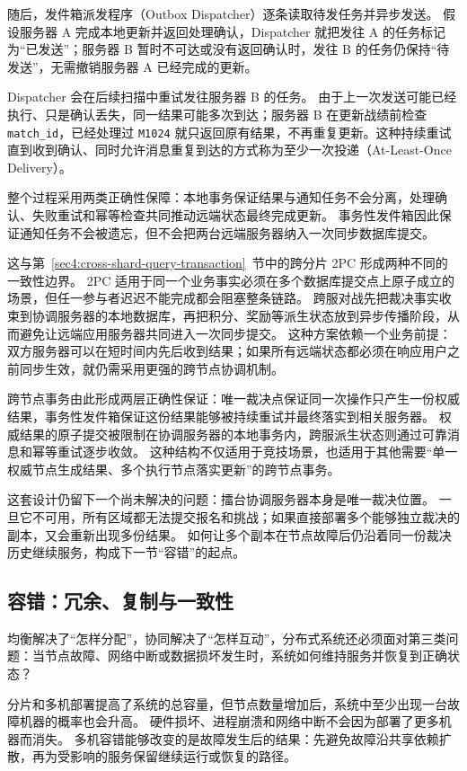 随后，发件箱派发程序（Outbox Dispatcher）逐条读取待发任务并异步发送。
假设服务器 A 完成本地更新并返回处理确认，Dispatcher 就把发往 A 的任务标记为“已发送”；服务器 B 暂时不可达或没有返回确认时，发往 B 的任务仍保持“待发送”，无需撤销服务器 A 已经完成的更新。

Dispatcher 会在后续扫描中重试发往服务器 B 的任务。
由于上一次发送可能已经执行、只是确认丢失，同一结果可能多次到达；服务器 B 在更新战绩前检查 \texttt{match\_id}，已经处理过 \texttt{M1024} 就只返回原有结果，不再重复更新。这种持续重试直到收到确认、同时允许消息重复到达的方式称为至少一次投递（At-Least-Once Delivery）。

整个过程采用两类正确性保障：本地事务保证结果与通知任务不会分离，处理确认、失败重试和幂等检查共同推动远端状态最终完成更新。
事务性发件箱因此保证通知任务不会被遗忘，但不会把两台远端服务器纳入一次同步数据库提交。

这与第~\ref{sec4:cross-shard-query-transaction}~节中的跨分片 2PC 形成两种不同的一致性边界。
2PC 适用于同一个业务事实必须在多个数据库提交点上原子成立的场景，但任一参与者迟迟不能完成都会阻塞整条链路。
跨服对战先把裁决事实收束到协调服务器的本地数据库，再把积分、奖励等派生状态放到异步传播阶段，从而避免让远端应用服务器共同进入一次同步提交。
这种方案依赖一个业务前提：双方服务器可以在短时间内先后收到结果；如果所有远端状态都必须在响应用户之前同步生效，就仍需采用更强的跨节点协调机制。

跨节点事务由此形成两层正确性保证：唯一裁决点保证同一次操作只产生一份权威结果，事务性发件箱保证这份结果能够被持续重试并最终落实到相关服务器。
权威结果的原子提交被限制在协调服务器的本地事务内，跨服派生状态则通过可靠消息和幂等重试逐步收敛。
这种结构不仅适用于竞技场景，也适用于其他需要“单一权威节点生成结果、多个执行节点落实更新”的跨节点事务。

这套设计仍留下一个尚未解决的问题：擂台协调服务器本身是唯一裁决位置。
一旦它不可用，所有区域都无法提交报名和挑战；如果直接部署多个能够独立裁决的副本，又会重新出现多份结果。
如何让多个副本在节点故障后仍沿着同一份裁决历史继续服务，构成下一节“容错”的起点。


\subsection{容错：冗余、复制与一致性}\label{sec4:fault-tolerance}

均衡解决了“怎样分配”，协同解决了“怎样互动”，分布式系统还必须面对第三类问题：当节点故障、网络中断或数据损坏发生时，系统如何维持服务并恢复到正确状态？

分片和多机部署提高了系统的总容量，但节点数量增加后，系统中至少出现一台故障机器的概率也会升高。
硬件损坏、进程崩溃和网络中断不会因为部署了更多机器而消失。
多机容错能够改变的是故障发生后的结果：先避免故障沿共享依赖扩散，再为受影响的服务保留继续运行或恢复的路径。

